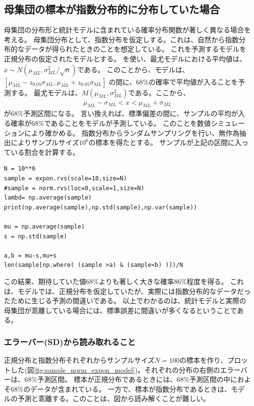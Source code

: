 \subsection{母集団の標本が指数分布的に分布していた場合}
母集団の分布形と統計モデルに含まれている確率分布関数が著しく異なる場合を考える。
母集団分布として、指数分布を仮定しする。これは、自然から指数分布的なデータが得られたときのことを想定している。
これを予測するモデルを正規分布の仮定されたモデルとする。
を使い、最尤モデルにおける平均値は、
$\bar{x}\sim N(\mu_{ML},\sigma^2_{ML}/\sqrt{n})$である。
このことから、モデルは、$\left[ \mu_{ML}-z_{0.05}\sigma_{ML},\mu_{ML}+z_{0.05}\sigma_{ML} \right]$
の間に、$68\%$の確率で平均値が入ることを予測する。
\fi
最尤モデルは、$M(\mu_{ML},\sigma^2_{ML})$である。ここから、
\begin{eqnarray*}
    \mu_{ML}-\sigma_{ML} < x < \mu_{ML}+\sigma_{ML}
\end{eqnarray*}
が$68\%$予測区間になる。
言い換えれば、標準偏差の間に、サンプルの平均が入る確率が$68\%$であることをモデルが予測している。
このことを数値シミュレーションにより確かめる。
指数分布からランダムサンプリングを行い、無作為抽出によりサンプルサイズ$10^6$の標本を得たとする。
サンプルが上記の区間に入っている割合を計算する。

\begin{lstlisting}
N = 10**6
sample = expon.rvs(scale=10,size=N)
#sample = norm.rvs(loc=0,scale=1,size=N)
lambd= np.average(sample)
print(np.average(sample),np.std(sample),np.var(sample))

mu = np.average(sample)
s = np.std(sample)

a,b = mu-s,mu+s
len(sample[np.where( (sample >a) & (sample<b) )])/N
\end{lstlisting}
この結果、期待していた値$68\%$よりも著しく大きな確率$86\%$程度を得る。
これは、モデルでは、正規分布を仮定していたが、実際には指数分布的なデータだったために生じる予測の間違いである。
以上でわかるのは、統計モデルと実際の母集団が乖離している場合には、標準誤差に間違いが多くなるということである。

\subsubsection{エラーバー(SD)から読み取れること}
正規分布と指数分布それぞれからサンプルサイズ$N=100$の標本を作り、プロットした(図\ref{fig:sample_norm_expon_model})。それぞれの分布の右側のエラーバーは、$68\%$予測区間。
標本が正規分布であるときには、$68\%$予測区間の中におよそ$68\%$のデータが含まれている。
一方で、標本が指数分布であるときは、モデルの予測と乖離する。このことは、図から読み解くことが難しい。

